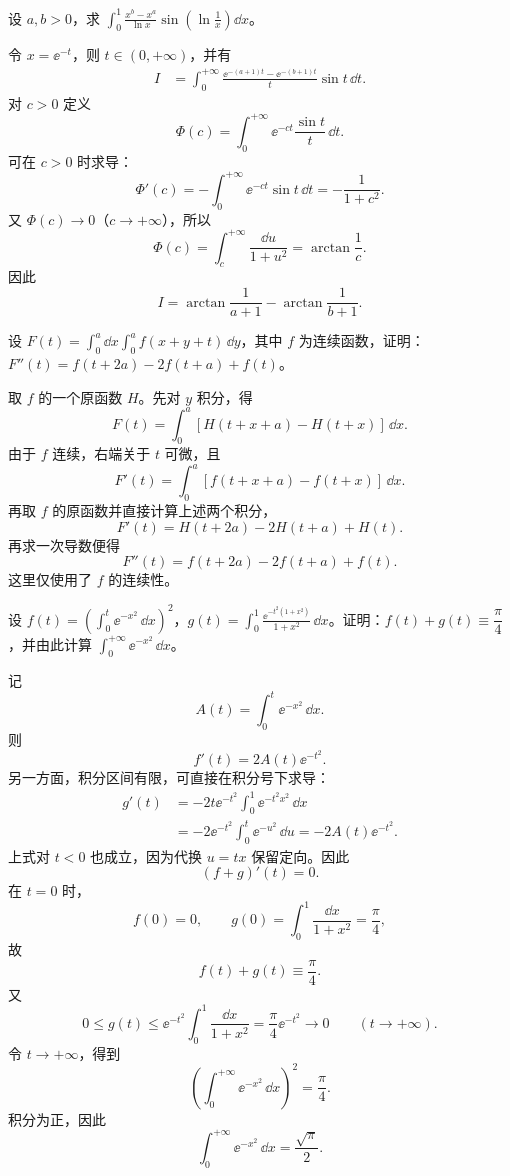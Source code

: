 \begin{xexercise}[5]
设 $a,b>0$，求 $\displaystyle\int_0^1\frac{x^b-x^a}{\ln x}\sin\left(\ln\frac1x\right)\dd x$。
\end{xexercise}
\begin{xsolution}
令 $x=\ee^{-t}$，则 $t\in(0,+\infty)$，并有
\[
\begin{aligned}
I
&=\int_0^{+\infty}\frac{\ee^{-(a+1)t}-\ee^{-(b+1)t}}{t}\sin t\,\dd t.
\end{aligned}
\]
对 $c>0$ 定义
\[
\Phi(c)=\int_0^{+\infty}\ee^{-ct}\frac{\sin t}{t}\,\dd t.
\]
可在 $c>0$ 时求导：
\[
\Phi'(c)=-\int_0^{+\infty}\ee^{-ct}\sin t\,\dd t=-\frac1{1+c^2}.
\]
又 $\Phi(c)\to0$（$c\to+\infty$），所以
\[
\Phi(c)=\int_c^{+\infty}\frac{\dd u}{1+u^2}=\arctan\frac1c.
\]
因此
\[
\boxed{I=\arctan\frac1{a+1}-\arctan\frac1{b+1}}.
\]
\end{xsolution}


\begin{xexercise}[6]
设 $F(t)=\displaystyle\int_0^a\dd x\int_0^a f(x+y+t)\,\dd y$，其中 $f$ 为连续函数，证明：$F''(t)=f(t+2a)-2f(t+a)+f(t)$。
\end{xexercise}
\begin{xsolution}
取 $f$ 的一个原函数 $H$。先对 $y$ 积分，得
\[
F(t)=\int_0^a[H(t+x+a)-H(t+x)]\,\dd x.
\]
由于 $f$ 连续，右端关于 $t$ 可微，且
\[
F'(t)=\int_0^a[f(t+x+a)-f(t+x)]\,\dd x.
\]
再取 $f$ 的原函数并直接计算上述两个积分，
\[
F'(t)=H(t+2a)-2H(t+a)+H(t).
\]
再求一次导数便得
\[
\boxed{F''(t)=f(t+2a)-2f(t+a)+f(t)}.
\]
这里仅使用了 $f$ 的连续性。
\end{xsolution}


\begin{xexercise}[7]
设 $f(t)=\left(\displaystyle\int_0^t\ee^{-x^2}\,\dd x\right)^2$，$g(t)=\displaystyle\int_0^1\frac{\ee^{-t^2(1+x^2)}}{1+x^2}\,\dd x$。证明：$f(t)+g(t)\equiv\dfrac\pi4$，并由此计算 $\displaystyle\int_0^{+\infty}\ee^{-x^2}\,\dd x$。
\end{xexercise}
\begin{xsolution}
记
\[
A(t)=\int_0^t\ee^{-x^2}\,\dd x.
\]
则
\[
f'(t)=2A(t)\ee^{-t^2}.
\]
另一方面，积分区间有限，可直接在积分号下求导：
\[
\begin{aligned}
g'(t)
&=-2t\ee^{-t^2}\int_0^1\ee^{-t^2x^2}\,\dd x\\
&=-2\ee^{-t^2}\int_0^t\ee^{-u^2}\,\dd u
=-2A(t)\ee^{-t^2}.
\end{aligned}
\]
上式对 $t<0$ 也成立，因为代换 $u=tx$ 保留定向。因此
\[
(f+g)'(t)=0.
\]
在 $t=0$ 时，
\[
f(0)=0,
\qquad
g(0)=\int_0^1\frac{\dd x}{1+x^2}=\frac\pi4,
\]
故
\[
\boxed{f(t)+g(t)\equiv\frac\pi4}.
\]
又
\[
0\leqslant g(t)\leqslant\ee^{-t^2}\int_0^1\frac{\dd x}{1+x^2}
=\frac\pi4\ee^{-t^2}\to0
\qquad(t\to+\infty).
\]
令 $t\to+\infty$，得到
\[
\left(\int_0^{+\infty}\ee^{-x^2}\,\dd x\right)^2=\frac\pi4.
\]
积分为正，因此
\[
\boxed{\int_0^{+\infty}\ee^{-x^2}\,\dd x=\frac{\sqrt\pi}{2}}.
\]
\end{xsolution}



